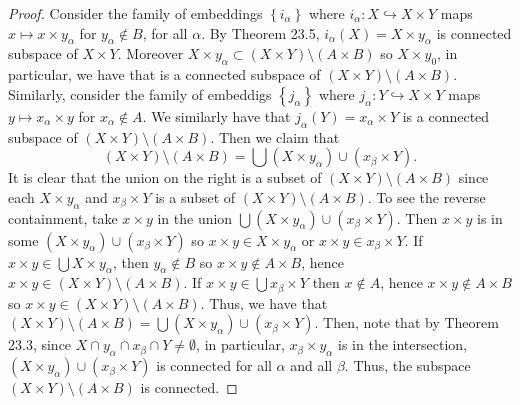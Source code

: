 \begin{proof}
Consider the family of embeddings $\left\{i_\alpha\right\}$
where $i_\alpha\colon X\hookrightarrow X\times Y$ maps
$x\mapsto x\times y_\alpha$ for $y_\alpha\notin B$, for all
$\alpha$. By Theorem 23.5, $i_\alpha(X)=X\times y_\alpha$ is
connected subspace of $X\times Y$. Moreover $X\times
y_\alpha\subset(X\times Y)\setminus(A\times B)$ so $X\times y_0$,
in particular, we have that is a connected subspace of $(X\times
Y)\setminus(A\times B)$. Similarly, consider the family of
embeddigs $\left\{j_\alpha\right\}$ where $j_\alpha\colon
Y\hookrightarrow X\times Y$ maps $y\mapsto x_\alpha\times y$ for
$x_\alpha\notin A$. We similarly have that
$j_\alpha(Y)=x_\alpha\times Y$ is a connected subspace of
$(X\times Y)\setminus(A\times B)$. Then we claim that
\[
(X\times Y)\setminus(A\times B)
=\bigcup (X\times y_\alpha)\cup(x_\beta\times Y).
\]
It is clear that the union on the right is a subset of $(X\times
Y)\setminus(A\times B)$ since each $X\times y_\alpha$ and
$x_\beta\times Y$ is a subset of $(X\times Y)\setminus(A\times
B)$. To see the reverse containment, take $x\times y$ in the
union $\bigcup (X\times y_\alpha)\cup(x_\beta\times Y)$. Then
$x\times y$ is in some $(X\times y_\alpha)\cup(x_\beta\times Y)$
so $x\times y\in X\times y_\alpha$ or $x\times y\in x_\beta\times
Y$. If $x\times y\in\bigcup X\times y_\alpha$, then
$y_\alpha\notin B$ so $x\times y\notin A\times B$, hence $x\times
y\in(X\times Y)\setminus(A\times B)$. If $x\times y\in\bigcup
x_\beta\times Y$ then $x\notin A$, hence $x\times y\notin
A\times B$ so $x\times y\in(X\times Y)\setminus(A\times
B)$. Thus, we have that $(X\times Y)\setminus(A\times
B)=\bigcup (X\times y_\alpha)\cup(x_\beta\times Y)$. Then, note
that by Theorem 23.3, since $X\cap  y_\alpha\cap x_\beta\cap
Y\neq\emptyset$, in particular, $x_\beta\times y_\alpha$ is in
the intersection, $(X\times y_\alpha)\cup(x_\beta\times Y)$ is
connected for all $\alpha$ and all $\beta$. Thus, the subspace
$(X\times Y)\setminus(A\times B)$ is connected.
\end{proof}
